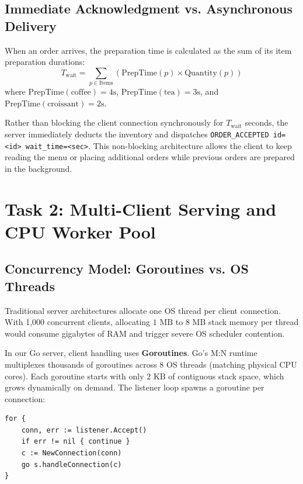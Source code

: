 \documentclass{labreport}
\begin{document}
\subsection{Immediate Acknowledgment vs. Asynchronous Delivery}
When an order arrives, the preparation time is calculated as the sum of its item preparation durations:
\begin{equation}
T_{\text{wait}} = \sum_{p \in \text{Items}} (\text{PrepTime}(p) \times \text{Quantity}(p))
\end{equation}
where $\text{PrepTime}(\text{coffee}) = 4\text{s}$, $\text{PrepTime}(\text{tea}) = 3\text{s}$, and $\text{PrepTime}(\text{croissant}) = 2\text{s}$. 

Rather than blocking the client connection synchronously for $T_{\text{wait}}$ seconds, the server immediately deducts the inventory and dispatches \texttt{ORDER\_ACCEPTED id=<id> wait\_time=<sec>}. This non-blocking architecture allows the client to keep reading the menu or placing additional orders while previous orders are prepared in the background.

\newpage

\section{Task 2: Multi-Client Serving and CPU Worker Pool}

\subsection{Concurrency Model: Goroutines vs. OS Threads}
Traditional server architectures allocate one OS thread per client connection. With 1,000 concurrent clients, allocating $1\text{ MB}$ to $8\text{ MB}$ stack memory per thread would consume gigabytes of RAM and trigger severe OS scheduler contention.

In our Go server, client handling uses \textbf{Goroutines}. Go's M:N runtime multiplexes thousands of goroutines across 8 OS threads (matching physical CPU cores). Each goroutine starts with only $2\text{ KB}$ of contiguous stack space, which grows dynamically on demand. The listener loop spawns a goroutine per connection:
\begin{lstlisting}[style=golang]
for {
    conn, err := listener.Accept()
    if err != nil { continue }
    c := NewConnection(conn)
    go s.handleConnection(c)
}
\end{lstlisting}
\end{document}
